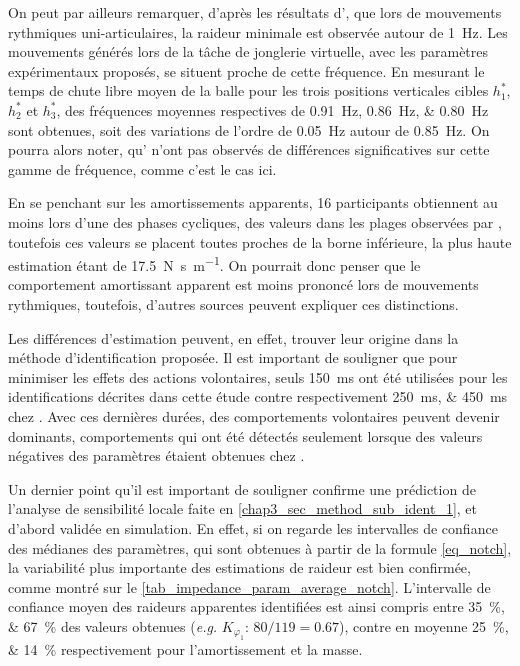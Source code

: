 On peut par ailleurs remarquer, d'après les résultats d'\textcite{abe_modulation_2003}, que lors de mouvements rythmiques uni-articulaires, la raideur minimale est observée autour de \SI{1}{\hertz}. Les mouvements générés lors de la tâche de jonglerie virtuelle, avec les paramètres expérimentaux proposés, se situent proche de cette fréquence. %
En mesurant le temps de chute libre moyen de la balle pour les trois positions verticales cibles $h_1^*$, $h_2^*$ et $h_3^*$, des fréquences moyennes respectives de \SIlist{0.91;0.86;0.80}{\hertz} sont obtenues, soit des variations de l'ordre de \SIlist{0.05}{\hertz} autour de \SI{0.85}{\hertz}. On pourra alors noter, qu'\textcite{abe_modulation_2003} n'ont pas observés de différences significatives sur cette gamme de fréquence, comme c'est le cas ici.%

En se penchant sur les amortissements apparents, 16 participants obtiennent au moins lors d'une des phases cycliques, des valeurs dans les plages observées par \textcite{erden_hand_2015}, toutefois ces valeurs se placent toutes proches de la borne inférieure, la plus haute estimation étant de \SI{17.5}{\newton\second\per\meter}. On pourrait donc penser que le comportement amortissant apparent est moins prononcé lors de mouvements rythmiques, toutefois, d'autres sources peuvent expliquer ces distinctions. 

Les différences d'estimation peuvent, en effet, trouver leur origine dans la méthode d'identification proposée. Il est important de souligner que pour minimiser les effets des actions volontaires, seuls \SI{150}{\milli\second} ont été utilisées pour les identifications décrites dans cette étude contre respectivement \SIlist{250;450}{\milli\second} chez \textcite{erden_hand_2015,tsuji_bio-mimetic_2008}. Avec ces dernières durées, des comportements volontaires peuvent devenir dominants, comportements qui ont été détectés seulement lorsque des valeurs négatives des paramètres étaient obtenues chez \textcite{erden_hand_2015}.

Un dernier point qu'il est important de souligner confirme une prédiction de l'analyse de sensibilité locale faite en \cref{chap3_sec_method_sub_ident_1}, et d'abord validée en simulation. En effet, si on regarde les intervalles de confiance des médianes des paramètres, qui sont obtenues à partir de la formule \cref{eq_notch}, la variabilité plus importante des estimations de raideur est bien confirmée, comme montré sur le \cref{tab_impedance_param_average_notch}. L'intervalle de confiance moyen des raideurs apparentes identifiées est ainsi compris entre \SIlist{35;67}{\percent} des valeurs obtenues (\textit{e.g.} $K_{\varphi_1}$: $80/119=0.67$), contre en moyenne \SIlist{25;14}{\percent} respectivement pour l'amortissement et la masse. 


